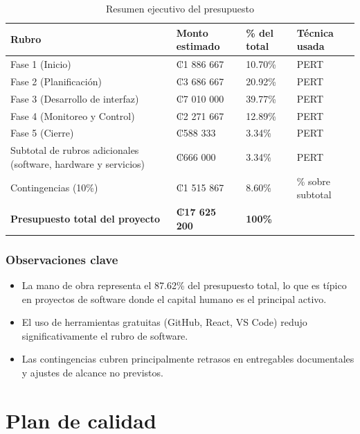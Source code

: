 \documentclass[11pt,spanish]{article}
\begin{document}
\begin{table}[H]
\centering
\caption{Resumen ejecutivo del presupuesto}
\label{tab:resumen-presupuesto}
\begin{tabularx}{\textwidth}{Y R{3.2cm} R{2.8cm} P{3cm}}
\toprule
\textbf{Rubro} & \textbf{Monto estimado} & \textbf{\% del total} & \textbf{Técnica usada} \\
\midrule
Fase 1 (Inicio) & ₡1 886 667 & 10.70\% & PERT \\
Fase 2 (Planificación) & ₡3 686 667 & 20.92\% & PERT \\
Fase 3 (Desarrollo de interfaz) & ₡7 010 000 & 39.77\% & PERT \\
Fase 4 (Monitoreo y Control) & ₡2 271 667 & 12.89\% & PERT \\
Fase 5 (Cierre) & ₡588 333 & 3.34\% & PERT \\
Subtotal de rubros adicionales (software, hardware y servicios) & ₡666 000 & 3.34\% & PERT \\
Contingencias (10\%) & ₡1 515 867 & 8.60\% & \% sobre subtotal \\
\midrule
\textbf{Presupuesto total del proyecto} & \textbf{₡17 625 200} & \textbf{100\%} & \\
\bottomrule
\end{tabularx}
\end{table}

\subsubsection{Observaciones clave}

\begin{itemize}
    \item La mano de obra representa el 87.62\% del presupuesto total, lo que es típico en proyectos de software donde el capital humano es el principal activo.
    \item El uso de herramientas gratuitas (GitHub, React, VS Code) redujo significativamente el rubro de software.
    \item Las contingencias cubren principalmente retrasos en entregables documentales y ajustes de alcance no previstos.
\end{itemize}

\newpage
\section{Plan de calidad}
\end{document}
